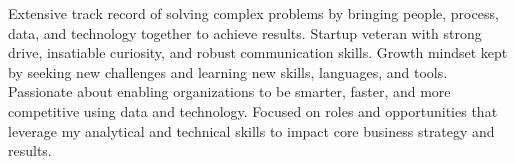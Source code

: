 


\cvparagraph
Extensive track record of solving complex problems by bringing people, process, data, and technology together to achieve results. Startup veteran with strong drive, insatiable curiosity, and robust communication skills. Growth mindset kept by seeking new challenges and learning new skills, languages, and tools. Passionate about enabling organizations to be smarter, faster, and more competitive using data and technology. Focused on roles and opportunities that leverage my analytical and technical skills to impact core business strategy and results. 






